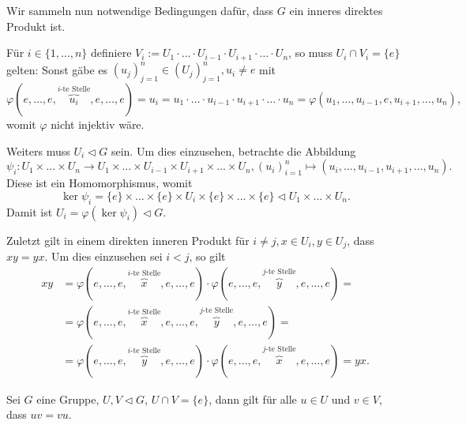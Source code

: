 \begin{remark} \label{remark:inneres-direktes-produkt-notwendig}
    Wir sammeln nun notwendige Bedingungen dafür, dass $G$ ein inneres direktes Produkt ist.
    
    Für $i \in \{ 1,\hdots,n \}$ definiere $V_i := U_1 \cdot \hdots \cdot U_{i-1} \cdot U_{i+1} \cdot \hdots \cdot U_n$, so muss $U_i \cap V_i = \{ e \}$ gelten:
    Sonst gäbe es $(u_j)_{j=1}^n \in (U_j)_{j=1}^n, u_i \neq e$ mit
    $$ \varphi(e, \hdots, e, \overbrace{u_i}^{\textrm{$i$-te Stelle}}, e, \hdots, e) = u_i = u_1 \cdot \hdots \cdot u_{i-1} \cdot u_{i+1} \cdot \hdots \cdot u_n = \varphi(u_1, \hdots, u_{i-1}, e, u_{i+1}, \hdots, u_n), $$
    womit $\varphi$ nicht injektiv wäre.

    Weiters muss $U_i \vartriangleleft G$ sein. Um dies einzusehen, betrachte die Abbildung
    $$ \psi_i : U_1 \times ... \times U_n \to U_1 \times ... \times U_{i-1} \times U_{i+1} \times ... \times U_n, (u_i)_{i=1}^n \mapsto (u_i, \hdots, u_{i-1}, u_{i+1}, \hdots, u_n). $$
    Diese ist ein Homomorphismus, womit
    $$ \ker \psi_i = \{e\} \times ... \times \{e\} \times U_i \times \{e\} \times ... \times \{e\} \vartriangleleft U_1 \times ... \times U_n. $$
    Damit ist $U_i = \varphi(\ker \psi_i) \vartriangleleft G$.

    Zuletzt gilt in einem direkten inneren Produkt für $i \neq j, x \in U_i, y \in U_j$, dass $xy = yx$. Um dies einzusehen sei \obda $i < j$, so gilt
    \begin{align*}        
        xy &= \varphi(e, \hdots, e, \overbrace{x}^{\textrm{$i$-te Stelle}}, e, \hdots, e) \cdot \varphi(e, \hdots, e, \overbrace{y}^{\textrm{$j$-te Stelle}}, e, \hdots, e) =  \\ &= \varphi(e, \hdots, e, \overbrace{x}^{\textrm{$i$-te Stelle}}, e, \hdots, e, \overbrace{y}^{\textrm{$j$-te Stelle}}, e, \hdots, e) = \\ &= \varphi(e, \hdots, e, \overbrace{y}^{\textrm{$i$-te Stelle}}, e, \hdots, e) \cdot \varphi(e, \hdots, e, \overbrace{x}^{\textrm{$j$-te Stelle}}, e, \hdots, e) = yx.
    \end{align*}
\end{remark}

\begin{lemma} \label{lemma:gruppe-normalteiler-kommutativ}
    Sei $G$ eine Gruppe, $U, V \vartriangleleft G$, $U \cap V = \{ e \}$, dann gilt für alle $u \in U$ und $v \in V$, dass $uv = vu$.
\end{lemma}

